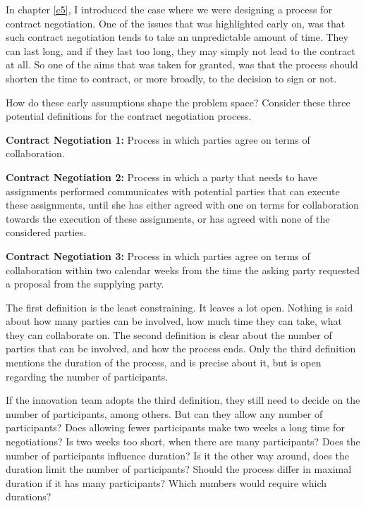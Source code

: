 In chapter \ref{c5}, I introduced the case where we were designing a process for contract negotiation. One of the issues that was highlighted early on, was that such contract negotiation tends to take an unpredictable amount of time. They can last long, and if they last too long, they may simply not lead to the contract at all. So one of the aims that was taken for granted, was that the process should shorten the time to contract, or more broadly, to the decision to sign or not.

How do these early assumptions shape the problem space? Consider these three potential definitions for the contract negotiation process.

\begin{svgraybox}
\textbf{Contract Negotiation 1:} Process in which parties agree on terms of collaboration.

\noindent\textbf{Contract Negotiation 2:} Process in which a party that needs to have assignments performed communicates with potential parties that can execute these assignments, until she has either agreed with one on terms for collaboration towards the execution of these assignments, or has agreed with none of the considered parties.

\noindent\textbf{Contract Negotiation 3:} Process in which parties agree on terms of collaboration within two calendar weeks from the time the asking party requested a proposal from the supplying party.
\end{svgraybox}

The first definition is the least constraining. It leaves a lot open. Nothing is said about how many parties can be involved, how much time they can take, what they can collaborate on. The second definition is clear about the number of parties that can be involved, and how the process ends. Only the third definition mentions the duration of the process, and is precise about it, but is open regarding the number of participants.

If the innovation team adopts the third definition, they still need to decide on the number of participants, among others. But can they allow any number of participants? Does allowing fewer participants make two weeks a long time for negotiations? Is two weeks too short, when there are many participants? Does the number of participants influence duration? Is it the other way around, does the duration limit the number of participants? Should the process differ in maximal duration if it has many participants? Which numbers would require which durations?

